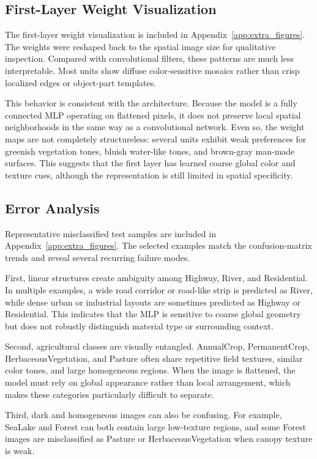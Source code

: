 \documentclass{article}
\begin{document}
\subsection{First-Layer Weight Visualization}

The first-layer weight visualization is included in Appendix~\ref{app:extra_figures}. The weights were reshaped back to the spatial image size for qualitative inspection. Compared with convolutional filters, these patterns are much less interpretable. Most units show diffuse color-sensitive mosaics rather than crisp localized edges or object-part templates.

This behavior is consistent with the architecture. Because the model is a fully connected MLP operating on flattened pixels, it does not preserve local spatial neighborhoods in the same way as a convolutional network. Even so, the weight maps are not completely structureless: several units exhibit weak preferences for greenish vegetation tones, bluish water-like tones, and brown-gray man-made surfaces. This suggests that the first layer has learned coarse global color and texture cues, although the representation is still limited in spatial specificity.

\subsection{Error Analysis}

Representative misclassified test samples are included in Appendix~\ref{app:extra_figures}. The selected examples match the confusion-matrix trends and reveal several recurring failure modes.

First, linear structures create ambiguity among Highway, River, and Residential. In multiple examples, a wide road corridor or road-like strip is predicted as River, while dense urban or industrial layouts are sometimes predicted as Highway or Residential. This indicates that the MLP is sensitive to coarse global geometry but does not robustly distinguish material type or surrounding context.

Second, agricultural classes are visually entangled. AnnualCrop, PermanentCrop, HerbaceousVegetation, and Pasture often share repetitive field textures, similar color tones, and large homogeneous regions. When the image is flattened, the model must rely on global appearance rather than local arrangement, which makes these categories particularly difficult to separate.

Third, dark and homogeneous images can also be confusing. For example, SeaLake and Forest can both contain large low-texture regions, and some Forest images are misclassified as Pasture or HerbaceousVegetation when canopy texture is weak.
\end{document}
